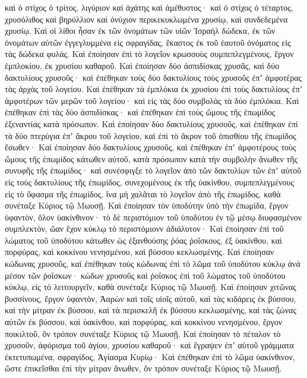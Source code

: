 {καὶ ὁ στίχος ὁ τρίτος, λιγύριον καὶ ἀχάτης καὶ ἀμέθυστος·
καὶ ὁ στίχος ὁ τέταρτος, χρυσόλιθος καὶ βηρύλλιον καὶ ὀνύχιον περικεκυκλωμένα χρυσίῳ, καὶ συνδεδεμένα χρυσίῳ.
Καὶ οἱ λίθοι ἦσαν ἐκ τῶν ὀνομάτων τῶν υἱῶν Ἰσραὴλ δώδεκα, ἐκ τῶν ὀνομάτων αὐτῶν ἐγγεγλυμμένα εἰς σφραγίδας, ἕκαστος ἐκ τοῦ ἑαυτοῦ ὀνόματος εἰς τὰς δώδεκα φυλάς.
Καὶ ἐποίησαν ἐπὶ τὸ λογεῖον κρωσσοὺς συμπεπλεγμένους, ἔργον ἐμπλοκίου, ἐκ χρυσίου καθαροῦ.
Καὶ ἐποίησαν δύο ἀσπιδίσκας χρυσᾶς, καὶ δύο δακτυλίους χρυσοῦς· καὶ ἐπέθηκαν τοὺς δύο δακτυλίους τοὺς χρυσοῦς ἐπʼ ἀμφοτέρας τὰς ἀρχὰς τοῦ λογείου.
Καὶ ἐπέθηκαν τὰ ἐμπλόκια ἐκ χρυσίου ἐπὶ τοὺς δακτυλίους ἐπʼ ἀμφοτέρων τῶν μερῶν τοῦ λογείου·
καὶ εἰς τὰς δύο συμβολὰς τὰ δύο ἐμπλόκια. Καὶ ἐπέθηκαν ἐπὶ τὰς δύο ἀσπιδίσκας· καὶ ἐπέθηκαν ἐπὶ τοὺς ὤμους τῆς ἐπωμίδος ἐξεναντίας κατὰ πρόσωπον.
Καὶ ἐποίησαν δύο δακτυλίους χρυσοῦς, καὶ ἐπέθηκαν ἐπὶ τὰ δύο πτερύγια ἐπʼ ἄκρου τοῦ λογείου, καὶ ἐπὶ τὸ ἄκρον τοῦ ὀπισθίου τῆς ἐπωμίδος ἔσωθεν·
Καὶ ἐποίησαν δύο δακτυλίους χρυσοῦς, καὶ ἐπέθηκαν ἐπʼ ἀμφοτέρους τοὺς ὤμους τῆς ἐπωμίδος κάτωθεν αὐτοῦ, κατὰ πρόσωπον κατὰ τὴν συμβολὴν ἄνωθεν τῆς συνυφῆς τῆς ἐπωμίδος·
καὶ συνέσφιγξε τὸ λογεῖον ἀπὸ τῶν δακτυλίων τῶν ἐπʼ αὐτοῦ εἰς τοὺς δακτυλίους τῆς ἐπωμίδος, συνεχομένους ἐκ τῆς ὑακίνθου, συμπεπλεγμένους εἰς τὸ ὕφασμα τῆς ἐπωμίδος, ἵνα μὴ χαλᾶται τὸ λογεῖον ἀπὸ τῆς ἐπωμίδος, καθὰ συνέταξε Κύριος τῷ Μωυσῇ.
Καὶ ἐποίησαν τὸν ὑποδύτην ὑπὸ τὴν ἐπωμίδα, ἔργον ὑφαντὸν, ὅλον ὑακίνθινον·
τὸ δὲ περιστόμιον τοῦ ὑποδύτου ἐν τῷ μέσῳ διυφασμένον συμπλεκτὸν, ὤαν ἔχον κύκλῳ τὸ περιστόμιονν ἀδιάλυτον·
Καὶ ἐποίησαν ἐπὶ τοῦ λώματος τοῦ ὑποδύτου κάτωθεν ὡς ἐξανθούσης ῥόας ῥοΐσκους, ἐξ ὑακίνθου, καὶ πορφύρας, καὶ κοκκίνου νενησμένου, καὶ βύσσου κεκλωσμένης.
Καὶ ἐποίησαν κώδωνας χρυσοῦς, καὶ ἐπέθηκαν τοὺς κώδωνας ἐπὶ τὸ λῶμα τοῦ ὑποδύτου κύκλῳ ἀνὰ μέσον τῶν ῥοΐσκων·
κώδων χρυσοῦς καὶ ῥοΐσκος ἐπὶ τοῦ λώματος τοῦ ὑποδύτου κύκλῳ, εἰς τὸ λειτουργεῖν, καθὰ συνέταξε Κύριος τῷ Μωυσῇ.
Καὶ ἐποίησαν χιτῶνας βυσσίνους, ἔργον ὑφαντὸν, Ἀαρὼν καὶ τοῖς υἱοῖς αὐτοῦ,
καὶ τὰς κιδάρεις ἐκ βύσσου, καὶ τὴν μίτραν ἐκ βύσσου, καὶ τὰ περισκελῆ ἐκ βύσσου κεκλωσμένης,
καὶ τὰς ζώνας αὐτῶν ἐκ βύσσου, καὶ ὑακίνθου, καὶ πορφύρας, καὶ κοκκίνου νενησμένου, ἔργον ποικιλτοῦ, ὃν τρόπον συνέταξε Κύριος τῷ Μωυσῇ.
Καὶ ἐποίησαν τὸ πέταλον τὸ χρυσοῦν, ἀφόρισμα τοῦ ἁγίου, χρυσίου καθαροῦ· καὶ ἔγραψεν ἐπʼ αὐτοῦ γράμματα ἐκτετυπωμένα, σφραγίδος, Ἁγίασμα Κυρίῳ·
Καὶ ἐπέθηκαν ἐπὶ τὸ λῶμα ὑακίνθινον, ὥστε ἐπικεῖσθαι ἐπὶ τὴν μίτραν ἄνωθεν, ὅν τρόπον συνέταξε Κύριος τῷ Μωυσῇ.

}
